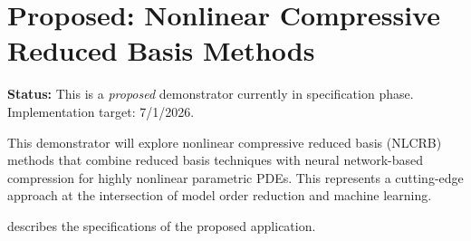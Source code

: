 
\section{Proposed: Nonlinear Compressive Reduced Basis Methods}
\label{sec:app:specs:app-feelpp-nlcrb}

\textbf{Status:} This is a \emph{proposed} demonstrator currently in specification phase. Implementation target: 7/1/2026.

This demonstrator will explore nonlinear compressive reduced basis (NLCRB) methods that combine reduced basis techniques with neural network-based compression for highly nonlinear parametric PDEs. This represents a cutting-edge approach at the intersection of model order reduction and machine learning.

 describes the specifications of the proposed application.

